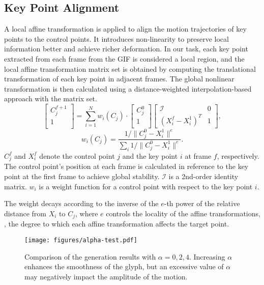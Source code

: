 \subsection{Key Point Alignment}
\label{sec: keypointalignment}
A local affine transformation is applied to align the motion trajectories of key points to the control points. It introduces non-linearity to preserve local information better and achieve richer deformation. 
In our task, each key point extracted from each frame from the GIF is considered a local region, and the local affine transformation matrix set is obtained by computing the translational transformation of each key point in adjacent frames. The global nonlinear transformation is then calculated using a distance-weighted interpolation-based approach with the matrix set.
$$
\left[\begin{array}{c}
C_{j}^{f+1} \\
1 \\
\end{array}\right]
=\sum_{i=1}^{N} w_{i}(C_{j})\cdot\left[\begin{array}{c}
C_{j}^0 \\
1 \\
\end{array}\right] \left[\begin{array}{cc}
\mathcal{I} & 0 \\
(X_{i}^{f} - X_{i}^1)^{T} & 1
\end{array}\right],
$$
$$
w_i(C_{j})=\frac{1 / \|C_{j}^0 - X_{i}^1\|^{e}}{\sum_i 1 /\|C_{j}^0 - X_{i}^1\|^{e}}.
$$
$C_{j}^f$ and $X_{i}^f$ denote the control point $j$ and the key point $i$ at frame $f$, respectively. The control point's position at each frame is calculated in reference to the key point at the first frame to achieve global stability. $\mathcal{I}$ is a 2nd-order identity matrix. $w_i$ is a weight function for a control point with respect to the key point $i$.

The weight decays according to the inverse of the $e$-th power of the relative distance from $X_i$ to $C_j$, where $e$ controls the locality of the affine transformations, \ie, the degree to which each affine transformation affects the target point.
\begin{figure*}[t]
  \centering
  \texttt{[image: figures/alpha-test.pdf]}
  \caption{Comparison of the generation results with $\alpha = 0, 2, 4$. Increasing $\alpha$ enhances the smoothness of the glyph, but an excessive value of $\alpha$ may negatively impact the amplitude of the motion.}
  \label{fig: ablation1}
\end{figure*}
